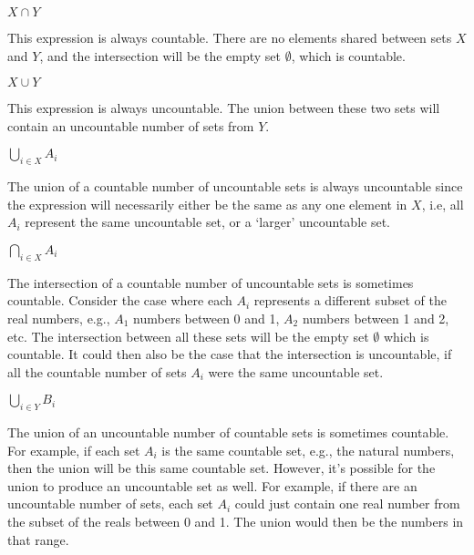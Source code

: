 \documentclass[11pt]{article}
\begin{document}
\begin{Parts}

\Part $X \cap Y$

\begin{solution}
    This expression is always countable. There are no elements shared between 
    sets $X$ and $Y$, and the intersection will be the empty set $\emptyset$,
    which is countable. 
\end{solution}

\Part $X \cup Y$

\begin{solution}
    This expression is always uncountable. The union between these two sets will
    contain an uncountable number of sets from $Y$.
\end{solution}
	
\Part $\bigcup_{i \in X} A_i$

\begin{solution}
    The union of a countable number of uncountable sets is always uncountable
    since the expression will necessarily either be the same as any one element
    in $X$, i.e, all $A_i$ represent the same uncountable set, or a `larger' 
    uncountable set.
\end{solution}

\Part $\bigcap_{i \in X} A_i$

\begin{solution}
    The intersection of a countable number of uncountable sets is sometimes
    countable. Consider the case where each $A_i$ represents a different 
    subset of the real numbers, e.g., $A_1$ numbers between 0 and 1, $A_2$
    numbers between 1 and 2, etc. The intersection between all these sets 
    will be the empty set $\emptyset$ which is countable. It could then also
    be the case that the intersection is uncountable, if all the countable
    number of sets $A_i$ were the same uncountable set. 
\end{solution}

\Part $\bigcup_{i \in Y} B_i$

\begin{solution}
    The union of an uncountable number of countable sets is sometimes countable.
    For example, if each set $A_i$ is the same countable set, e.g., the natural
    numbers, then the union will be this same countable set. However, it's
    possible for the union to produce an uncountable set as well. For example, 
    if there are an uncountable number of sets, each set $A_i$ could just contain
    one real number from the subset of the reals between 0 and 1. The union would
    then be the numbers in that range.
\end{solution}


\end{Parts}
\end{document}
